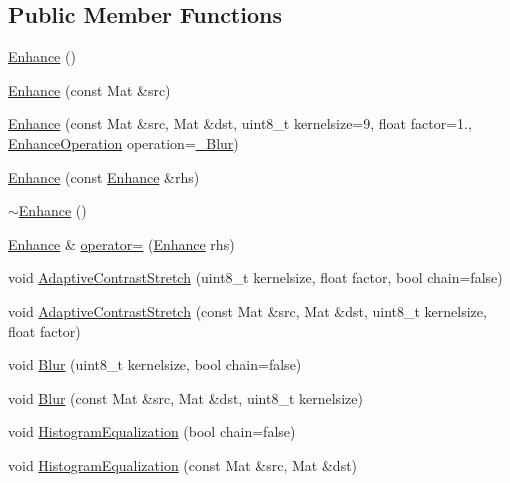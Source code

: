\subsection*{Public Member Functions}
\begin{DoxyCompactItemize}
\item 
\hyperlink{class_vision_1_1_enhance_ac22cbe167e6de1ba724c2ad54dc6eafa}{Enhance} ()
\item 
\hyperlink{class_vision_1_1_enhance_af3872f07fef0911b32e81f6968b3d737}{Enhance} (const Mat \&src)
\item 
\hyperlink{class_vision_1_1_enhance_a5c09dcb8d1ae53757c19bc9d11604399}{Enhance} (const Mat \&src, Mat \&dst, uint8\+\_\+t kernelsize=9, float factor=1., \hyperlink{class_vision_1_1_enhance_a36caf2ddf5cb2575bfae8bcdca04e58e}{Enhance\+Operation} operation=\hyperlink{class_vision_1_1_enhance_a36caf2ddf5cb2575bfae8bcdca04e58ea5245bfc56341cd91a53b2fcb676c8fc8}{\+\_\+\+Blur})
\item 
\hyperlink{class_vision_1_1_enhance_acd901de386620bb44184e6929570dc09}{Enhance} (const \hyperlink{class_vision_1_1_enhance}{Enhance} \&rhs)
\item 
\hyperlink{class_vision_1_1_enhance_a21a664b0a5994ce163c3f8958adfd733}{$\sim$\+Enhance} ()
\item 
\hyperlink{class_vision_1_1_enhance}{Enhance} \& \hyperlink{class_vision_1_1_enhance_ab8663acdb0dbdb047f3e2d135a7faed2}{operator=} (\hyperlink{class_vision_1_1_enhance}{Enhance} rhs)
\item 
void \hyperlink{class_vision_1_1_enhance_a7aa0dfb4808ffc7abddd7fe4e30f6601}{Adaptive\+Contrast\+Stretch} (uint8\+\_\+t kernelsize, float factor, bool chain=false)
\item 
void \hyperlink{class_vision_1_1_enhance_acfe671366d83e6f1a8817395acae45e7}{Adaptive\+Contrast\+Stretch} (const Mat \&src, Mat \&dst, uint8\+\_\+t kernelsize, float factor)
\item 
void \hyperlink{class_vision_1_1_enhance_a5062a7481326dce9ab7ece19bc3b44c9}{Blur} (uint8\+\_\+t kernelsize, bool chain=false)
\item 
void \hyperlink{class_vision_1_1_enhance_ade17605655c40a18ed6511429e80710e}{Blur} (const Mat \&src, Mat \&dst, uint8\+\_\+t kernelsize)
\item 
void \hyperlink{class_vision_1_1_enhance_aa22bf01c06e941aa40e0075fac9aad8f}{Histogram\+Equalization} (bool chain=false)
\item 
void \hyperlink{class_vision_1_1_enhance_aa6be729d2eb1a1d8cf31682aa7be1077}{Histogram\+Equalization} (const Mat \&src, Mat \&dst)
\end{DoxyCompactItemize}
